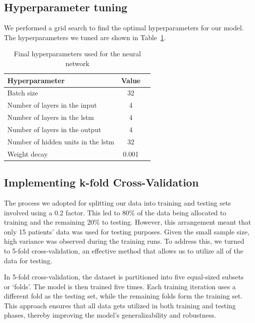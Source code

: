 \subsection{Hyperparameter tuning}

We performed a grid search to find the optimal hyperparameters for our model.
The hyperparameters we tuned are shown in
Table~\ref{tab:final-hyperparameters}.

\begin{table}[h]
    \centering
    \begin{tabular}{l c c}
        \toprule
        \textbf{Hyperparameter}                  & \textbf{Value} \\
        \midrule
        Batch size                               & 32             \\
        Number of layers in the input            & 4              \\
        Number of layers in the \gls{lstm}       & 4              \\
        Number of layers in the output           & 4              \\
        Number of hidden units in the \gls{lstm} & 32             \\
        Weight decay                             & 0.001          \\
        \bottomrule
    \end{tabular}
    \caption{Final hyperparameters used for the neural network}
    \label{tab:final-hyperparameters}
\end{table}

\subsection{Implementing k-fold Cross-Validation}

The process we adopted for splitting our data into training and testing sets
involved using a 0.2 factor. This led to 80\% of the data being allocated to
training and the remaining 20\% to testing. However, this arrangement meant
that only 15 patients' data was used for testing purposes. Given the small
sample size, high variance was observed during the training runs. To address
this, we turned to 5-fold cross-validation, an effective method that allows us
to utilize all of the data for testing.

In 5-fold cross-validation, the dataset is partitioned into five equal-sized
subsets or `folds'. The model is then trained five times. Each training
iteration uses a different fold as the testing set, while the remaining folds
form the training set. This approach ensures that all data gets utilized in
both training and testing phases, thereby improving the model's
generalizability and robustness.

